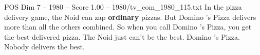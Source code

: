 \begin{textsample}{POS Dim 7 – 1980 – Score 1.00 – 1980/tv\_com\_1980\_115.txt}  \label{ex:f7_pos_048}
In the pizza delivery game, the Noid can zap \textbf{ordinary} pizzas.
But Domino 's Pizza delivers more than all the others combined.
So when you call Domino 's Pizza, you get the best delivered pizza.
The Noid just can't be the best.
Domino 's Pizza.
Nobody delivers the best.

\end{textsample}
